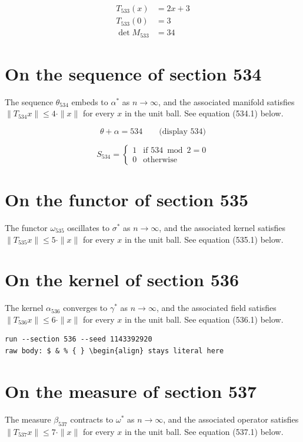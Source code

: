 \documentclass{article}
\begin{document}
\begin{align}
T_{533}(x) &= 2 x + 3 \\
T_{533}(0) &= 3 \\
\det M_{533} &= 34
\end{align}

\section{On the sequence of section 534}
The sequence $\theta_{534}$ embeds to $\alpha^{*}$ as $n \to \infty$,
and the associated manifold satisfies $\|T_{534} x\| \leq 4 \cdot \|x\|$
for every $x$ in the unit ball. See equation (534.1) below.

$$
\theta + \alpha = 534 \qquad \text{(display 534)}
$$

\begin{equation}
S_{534} = \begin{cases} 1 & \text{if } 534 \bmod 2 = 0 \\ 0 & \text{otherwise} \end{cases}
\end{equation}

\section{On the functor of section 535}
The functor $\omega_{535}$ oscillates to $\sigma^{*}$ as $n \to \infty$,
and the associated kernel satisfies $\|T_{535} x\| \leq 5 \cdot \|x\|$
for every $x$ in the unit ball. See equation (535.1) below.

\section{On the kernel of section 536}
The kernel $\alpha_{536}$ converges to $\gamma^{*}$ as $n \to \infty$,
and the associated field satisfies $\|T_{536} x\| \leq 6 \cdot \|x\|$
for every $x$ in the unit ball. See equation (536.1) below.

\begin{verbatim}
run --section 536 --seed 1143392920
raw body: $ & % { } \begin{align} stays literal here
\end{verbatim}

\section{On the measure of section 537}
The measure $\beta_{537}$ contracts to $\omega^{*}$ as $n \to \infty$,
and the associated operator satisfies $\|T_{537} x\| \leq 7 \cdot \|x\|$
for every $x$ in the unit ball. See equation (537.1) below.
\end{document}
